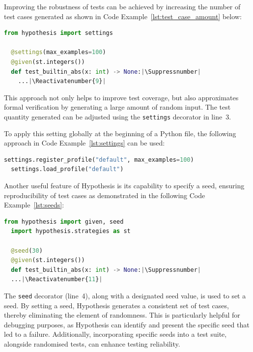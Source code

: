 \documentclass[runningheads]{llncs}
\makeatletter
\let\origthelstnumber\thelstnumber
\newcommand*\Suppressnumber{%
  \lst@AddToHook{OnNewLine}{%
    \let\thelstnumber\relax%
     \advance\c@lstnumber-\@ne\relax%
    }%
}
\newcommand*\Reactivatenumber[1]{%
  \setcounter{lstnumber}{\numexpr#1-1\relax}
  \lst@AddToHook{OnNewLine}{%
   \let\thelstnumber\origthelstnumber%
   \refstepcounter{lstnumber}%
  }%
}
\makeatother
\begin{document}
\vspace{5mm}
\noindent Improving the robustness of tests can be achieved by increasing the number of test cases generated as shown in Code Example~\ref{lst:test_case_amount} below:

\begin{lstlisting}[language=Python,caption={Specifying Test Case Amount from \texttt{tutorial.ipynb}},label=lst:test_case_amount]
  from hypothesis import settings

  @settings(max_examples=100)
  @given(st.integers())
  def test_builtin_abs(x: int) -> None:|\Suppressnumber|
    ...|\Reactivatenumber{9}|

\end{lstlisting}
This approach not only helps to improve test coverage, but also approximates formal verification by generating a large amount of random input. The test quantity generated can be adjusted using the \texttt{settings} decorator in line~3.

To apply this setting globally at the beginning of a Python file, the following approach in Code Example~\ref{lst:settings} can be used:

\begin{lstlisting}[language=Python,caption={Global Settings from \texttt{tutorial.ipynb}},label=lst:settings]
  settings.register_profile("default", max_examples=100)
  settings.load_profile("default")
\end{lstlisting}

\vspace{5mm}
\noindent Another useful feature of Hypothesis is its capability to specify a seed, ensuring reproducibility of test cases as demonstrated in the following Code Example~\ref{lst:seeds}:

\begin{lstlisting}[language=Python,caption={Specifying Seeds from \texttt{tutorial.ipynb}},label=lst:seeds]
  from hypothesis import given, seed
  import hypothesis.strategies as st

  @seed(30)
  @given(st.integers())
  def test_builtin_abs(x: int) -> None:|\Suppressnumber|
  ...|\Reactivatenumber{11}|

\end{lstlisting}
The \texttt{seed} decorator (line~4), along with a designated seed value, is used to set a seed. By setting a seed, Hypothesis generates a consistent set of test cases, thereby eliminating the element of randomness. This is particularly helpful for debugging purposes, as Hypothesis can identify and present the specific seed that led to a failure. Additionally, incorporating specific seeds into a test suite, alongside randomised tests, can enhance testing reliability.
\end{document}
